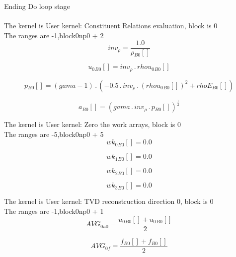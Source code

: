 \documentclass{article}
\begin{document}
\noindent Ending Do loop stage\\
\\\noindent The kernel is User kernel: Constituent Relations evaluation, block is 0\\\noindent The ranges are -1,block0np0 + 2\\\begin{dmath}inv_{\rho} = \frac{1.0}{{\rho{_{B0}}}[{}]}\end{dmath}

\begin{dmath}{u_{0}{_{B0}}}[{}] = inv_{\rho} \,.\, {rhou_{0}{_{B0}}}[{}]\end{dmath}

\begin{dmath}{p{_{B0}}}[{}] = \left(gama - 1\right) \,.\, \left(- 0.5 \,.\, inv_{\rho} \,.\, \left({rhou_{0}{_{B0}}}[{}] \right)^{2} + {rhoE{_{B0}}}[{}]\right)\end{dmath}

\begin{dmath}{a{_{B0}}}[{}] = \left(gama \,.\, inv_{\rho} \,.\, {p{_{B0}}}[{}] \right)^{\frac{1}{2}}\end{dmath}

\noindent The kernel is User kernel: Zero the work arrays, block is 0\\\noindent The ranges are -5,block0np0 + 5\\\begin{dmath}{wk_{0}{_{B0}}}[{}] = 0.0\end{dmath}

\begin{dmath}{wk_{1}{_{B0}}}[{}] = 0.0\end{dmath}

\begin{dmath}{wk_{2}{_{B0}}}[{}] = 0.0\end{dmath}

\begin{dmath}{wk_{3}{_{B0}}}[{}] = 0.0\end{dmath}

\noindent The kernel is User kernel: TVD reconstruction direction 0, block is 0\\\noindent The ranges are -1,block0np0 + 1\\\begin{dmath}AVG_{0 u0} = \frac{{u_{0}{_{B0}}}[{}] + {u_{0}{_{B0}}}[{}]}{2}\end{dmath}

\begin{dmath}AVG_{0 f} = \frac{{f{_{B0}}}[{}] + {f{_{B0}}}[{}]}{2}\end{dmath}
\end{document}
